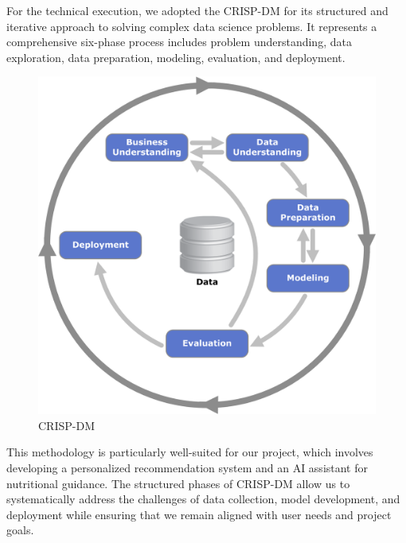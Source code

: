 For the technical execution, we adopted the CRISP-DM for its structured
and iterative approach to solving complex data science problems. It
represents a comprehensive six-phase process includes problem understanding, data exploration, data preparation, modeling, evaluation, and
deployment.
\begin{center}
\begin{figure}[H]
            \centering
            \includegraphics[scale=0.44]{images/CRISP.png}
            \caption{CRISP-DM} 
            \label{fig:CRISP_DM}
        \end{figure}
\end{center}

\par This methodology is particularly well-suited for our project, which involves
developing a personalized recommendation system and an AI assistant
for nutritional guidance. The structured phases of CRISP-DM allow
us to systematically address the challenges of data collection, model development, and deployment while ensuring that we remain aligned
with user needs and project goals.



